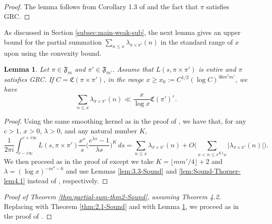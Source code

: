 \documentclass[12pt,reqno]{amsart}
\newtheorem{lem}[thm]{Lemma}
\theoremstyle{remark}
\numberwithin{equation}{section}
\begin{document}
	\begin{proof} The lemma follows from Corollary 1.3 of \cite{ST} and the fact that $\pi$ satisfies GRC.
        \end{proof}
	
	As discussed in Section \ref{subsec:main-weak-sub}, the next lemma gives an upper bound for the partial summation $\sum_{n\le x} \lambda_{\pi \times \pi'}(n)$ in the standard range of $x$ upon using the convexity bound.  
	
	\begin{lem}\label{lem:Sound-lem4.2} 
            Let $\pi \in \mathfrak{F}_{m}$ and $\pi' \in \mathfrak{F}_{m'}$. Assume that $L(s,\pi\times\pi')$ is entire and $\pi$ satisfies GRC. If $C = \mathfrak{C}(\pi\times \pi')$, in the range $x \ge x_0 := C^{1/2}(\log C)^{36 m^5m'}$, we have 
		\[
                \sum_{n\le x} \lambda_{\pi\times \pi'} (n) \ll \frac{x}{\log x}\mathfrak{C}(\pi')^\varepsilon.
		\]
	\end{lem}
	\begin{proof}
    Using the same smoothing kernel as in the proof of \cite[Lemma 4.2]{S}, we have that, for any $c >1$, $x > 0$, $\lambda > 0$, and any natural number $K$, \begin{equation}\label{eq:lem4.2-sound-1}
	\frac{1}{2\pi i}\int_{c-i\infty}^{c+i\infty} L(s,\pi\times\pi')\frac{x^s}{s}\Big(\frac{e^{\lambda s}-1}{\lambda s}\Big)^K \,ds = \sum_{n\le x}\lambda_{\pi\times\pi'}(n) + O\Big( \sum_{x < n \le e^{K\lambda}x} |\lambda_{\pi\times\pi'}(n)| \Big).
	\end{equation}
    We then proceed as in the proof of \cite[Lemma 4.2]{S} except we take $K =\lfloor mm'/4\rfloor+2$ and $\lambda = (\log x)^{-m^4-6}$ and use Lemmas \ref{lem:3.3-Sound} and \ref{lem:Sound-Thorner-lem4.1} instead of \cite[Lemmas 3.3, 4.1]{S}, respectively.
        \end{proof}

    \begin{proof}[Proof of Theorem \ref{thm:partial-sum-thm2-Sound}, assuming Theorem 4.2] 

    Replacing \cite[Theorem 2.1]{S} with Theorem \ref{thm:2.1-Sound} and \cite[Lemma 4.2]{S} with Lemma \ref{lem:Sound-lem4.2}, we proceed as in the proof of \cite[Theorem 2]{S}.
	\end{proof}
	
\end{document}

